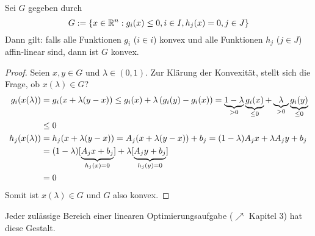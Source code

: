 \begin{aussage} %
	Sei $G$ gegeben durch
	\begin{equation*}
		G \mathrel{:=} \left\{ x \in \mathbb{R}^n : g_i(x) \le 0, i \in I, h_j(x) = 0, j \in J \right\}
	\end{equation*}
	Dann gilt: falls alle Funktionen $g_i$ ($i \in i$) konvex und alle Funktionen $h_j$ ($j \in J$) affin-linear sind, dann ist $G$ konvex.
\end{aussage}
\begin{proof}
	Seien $x,y \in G$ und $\lambda \in (0,1)$. Zur Klärung der Konvexität, stellt sich die Frage, ob $x(\lambda) \in G$?
	\begin{equation*}
		\begin{aligned}
		g_i(x(\lambda)) &= g_i(x + \lambda (y-x)) \le g_i(x) + \lambda \left( g_i(y) - g_i(x) \right) = \underbrace{1-\lambda}_{>0} \underbrace{g_i(x)}_{\le 0} + \underbrace{\lambda}_{>0} \underbrace{g_i(y)}_{\le 0} \\
		&\le 0 \\
		h_j(x(\lambda)) &= h_j(x + \lambda(y-x)) = A_j(x+\lambda(y-x)) + b_j = (1-\lambda) A_j x + \lambda A_j y + b_j \\
		&= (1-\lambda) [\underbrace{A_j x + b_j}_{h_j(x) = 0}] + \lambda [\underbrace{A_j y + b_j}_{h_j(y) = 0}] \\
		&= 0
		\end{aligned}
	\end{equation*}
	Somit ist $x(\lambda) \in G$ und $G$ also konvex.
\end{proof}

Jeder zulässige Bereich einer linearen Optimierungsaufgabe ($\nearrow$ Kapitel 3) hat diese Gestalt. %